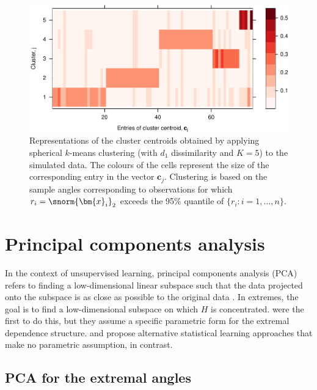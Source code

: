 \documentclass[en-GB, a4paper, nobind]{templates/bathreport}
\begin{document}
\begin{figure}
\includegraphics[width=1\linewidth]{figures/simHR-skmeans-1} \caption[Spherical $k$-means cluster centroids for the simulated data.]{Representations of the cluster centroids obtained by applying spherical $k$-means clustering (with $d_1$ dissimilarity and $K=5$) to the simulated data. The colours of the cells represent the size of the corresponding entry in the vector $\bm{c}_j$. Clustering is based on the sample angles corresponding to observations for which $r_i=\snorm{\bm{x}_i}_2$ exceeds the 95\% quantile of $\{r_i:i=1,\ldots,n\}$.}\label{fig:simHR-skmeans}
\end{figure}

\hypertarget{principal-components-analysis}{%
\section{Principal components analysis}\label{principal-components-analysis}}

In the context of unsupervised learning, principal components analysis (PCA) refers to finding a low-dimensional linear subspace such that the data projected onto the subspace is as close as possible to the original data \autocite{jamesIntroductionStatisticalLearning2021}. In extremes, the goal is to find a low-dimensional subspace on which \(H\) is concentrated. \textcite{haugDimensionReductionBased2009} were the first to do this, but they assume a specific parametric form for the extremal dependence structure. \textcite{dreesPrincipalComponentAnalysis2021} and \textcite{cooleyDecompositionsDependenceHighdimensional2019} propose alternative statistical learning approaches that make no parametric assumption, in contrast.

\hypertarget{pca-angles}{%
\subsection{PCA for the extremal angles}\label{pca-angles}}
\end{document}
